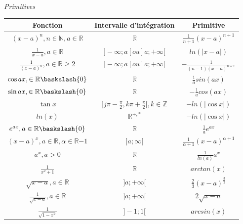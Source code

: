 \documentclass{article}
\begin{document}
\begin{center}
    \textit{Primitives}\\
    \begin{tabular}{|c|c|c|}
    \hline
    Fonction& Intervalle d'intégration & Primitive \\
    \hline
    $(x-a)^n , n\in \mathbb{N}, a\in \mathbb{R}$ & $ \mathbb{R}$ & $\frac{1}{n+1}(x-a)^{n+1}$ \\
    \hline
    $\frac{1}{x-a}, a\in \mathbb{R}$& $] -\infty;a[ou]a;+\infty [$& $ln(|x-a|)$\\
    \hline
    $ \frac{1}{(x-a)^n}, a \in \mathbb{R} \geqslant 2 $ & $] -\infty;a[ou]a;+\infty [$ & $-\frac{1}{(n-1)(x-a)^{n-1}}$\\
    \hline
    $\cos{ax}, \in \mathbb{R}\baskslash {0}$ & $\mathbb{R}$ & $\frac{1}{a} sin(ax)$ \\
    \hline
    $\sin{ax}, \in \mathbb{R}\baskslash {0}$ & $\mathbb{R}$ & $-\frac{1}{a} cos(ax)$ \\
    \hline
    $\tan{x}$ & $] j\pi -\frac{\pi}{2}, k\pi + \frac{\pi}{2} [, k\in \mathbb{Z}$ & $-ln(|\cos{x}|)$ \\
    \hline
    $ln(x)$ & $\mathbb{R}^{+,*}$ & $ -ln(|\cos{x}|) $ \\
    \hline
    $e^{ax}, a\in \mathbb{R} \baskslash {0}$ & $\mathbb{R}$ & $\frac{1}{a}e^{ax}$ \\
    \hline
    $(x-a)^x, a\in \mathbb{R}, \alpha\in \mathbb{R} {-1}$ & $] a;\infty [$ & $ \frac{1}{\alpha+1}(x-a)^{\alpha+1} $\\
    \hline
    $a^x,a>0$ & $\mathbb{R}$ & $\frac{1}{ln(a)}a^x$ \\
    \hline
    $ \frac{1}{x^2+1} $ & $ \mathbb{R} $ & $ arctan(x)$ \\
    \hline
    $ \sqrt{x-a}, a \in \mathbb{R} $ & $ ] a;+\infty [ $ & $ \frac{2}{3}(x-a)^{\frac{3}{2}} $ \\
    \hline
    $\frac{1}{\sqrt{x-a}}, a \in \mathbb{R}$ & $] a;+\infty [$ & $2\sqrt{x-a}$\\
    \hline
    $\frac{1}{\sqrt{1-x^2}}$ & $] -1;1 [$ & $arcsin(x)$ \\
    \hline
    \end{tabular}
\end{center}
\end{document}
